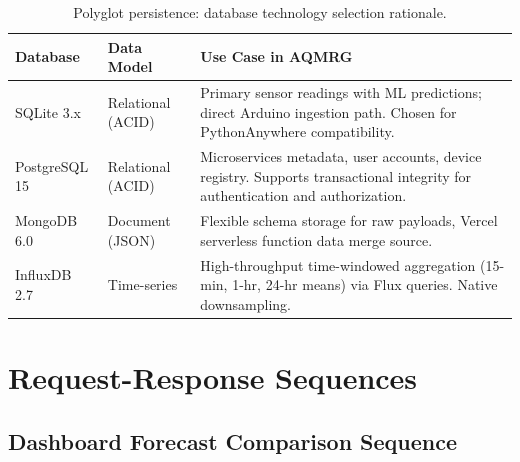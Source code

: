 \documentclass[12pt,a4paper]{article}
\begin{document}
\begin{table}[H]
\centering
\caption{Polyglot persistence: database technology selection rationale.}
\label{tab:polyglot}
\begin{tabular}{@{}llp{6cm}@{}}
\toprule
\textbf{Database} & \textbf{Data Model} & \textbf{Use Case in AQMRG} \\
\midrule
SQLite 3.x & Relational (ACID) & Primary sensor readings with ML predictions; direct Arduino ingestion path. Chosen for PythonAnywhere compatibility. \\
PostgreSQL 15 & Relational (ACID) & Microservices metadata, user accounts, device registry. Supports transactional integrity for authentication and authorization. \\
MongoDB 6.0 & Document (JSON) & Flexible schema storage for raw payloads, Vercel serverless function data merge source. \\
InfluxDB 2.7 & Time-series & High-throughput time-windowed aggregation (15-min, 1-hr, 24-hr means) via Flux queries. Native downsampling. \\
\bottomrule
\end{tabular}
\end{table}

\section{Request-Response Sequences}

\subsection{Dashboard Forecast Comparison Sequence}
\end{document}
